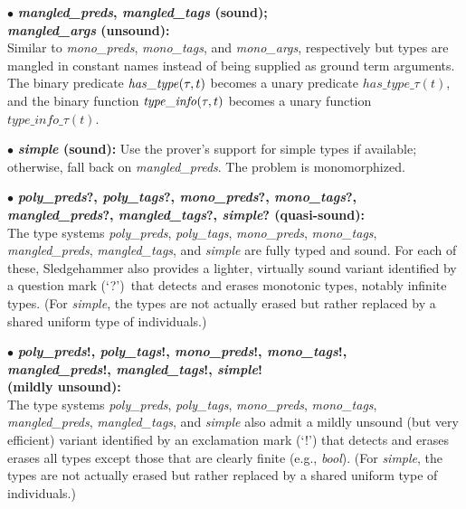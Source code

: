 \documentclass[a4paper,12pt]{article}
\begin{document}
\begin{enum}
\begin{enum}
\item[$\bullet$]
\textbf{%
\textit{mangled\_preds},
\textit{mangled\_tags} (sound); \\
\textit{mangled\_args} (unsound):} \\
Similar to
\textit{mono\_preds}, \textit{mono\_tags}, and \textit{mono\_args},
respectively but types are mangled in constant names instead of being supplied
as ground term arguments. The binary predicate $\mathit{has\_type\/}(\tau, t)$
becomes a unary predicate $\mathit{has\_type\_}\tau(t)$, and the binary function
$\mathit{type\_info\/}(\tau, t)$ becomes a unary function
$\mathit{type\_info\_}\tau(t)$.

\item[$\bullet$] \textbf{\textit{simple} (sound):} Use the prover's support for
simple types if available; otherwise, fall back on \textit{mangled\_preds}. The
problem is monomorphized.

\item[$\bullet$]
\textbf{%
\textit{poly\_preds}?, \textit{poly\_tags}?, \textit{mono\_preds}?, \textit{mono\_tags}?, \\
\textit{mangled\_preds}?, \textit{mangled\_tags}?, \textit{simple}? (quasi-sound):} \\
The type systems \textit{poly\_preds}, \textit{poly\_tags},
\textit{mono\_preds}, \textit{mono\_tags}, \textit{mangled\_preds},
\textit{mangled\_tags}, and \textit{simple} are fully typed and sound. For each
of these, Sledgehammer also provides a lighter, virtually sound variant
identified by a question mark (`{?}')\ that detects and erases monotonic types,
notably infinite types. (For \textit{simple}, the types are not actually erased
but rather replaced by a shared uniform type of individuals.)

\item[$\bullet$]
\textbf{%
\textit{poly\_preds}!, \textit{poly\_tags}!, \textit{mono\_preds}!, \textit{mono\_tags}!, \\
\textit{mangled\_preds}!, \textit{mangled\_tags}!, \textit{simple}! \\
(mildly unsound):} \\
The type systems \textit{poly\_preds}, \textit{poly\_tags},
\textit{mono\_preds}, \textit{mono\_tags}, \textit{mangled\_preds},
\textit{mangled\_tags}, and \textit{simple} also admit a mildly unsound (but
very efficient) variant identified by an exclamation mark (`{!}') that detects
and erases erases all types except those that are clearly finite (e.g.,
\textit{bool}). (For \textit{simple}, the types are not actually erased but
rather replaced by a shared uniform type of individuals.)


\end{enum}
\end{enum}
\end{document}
